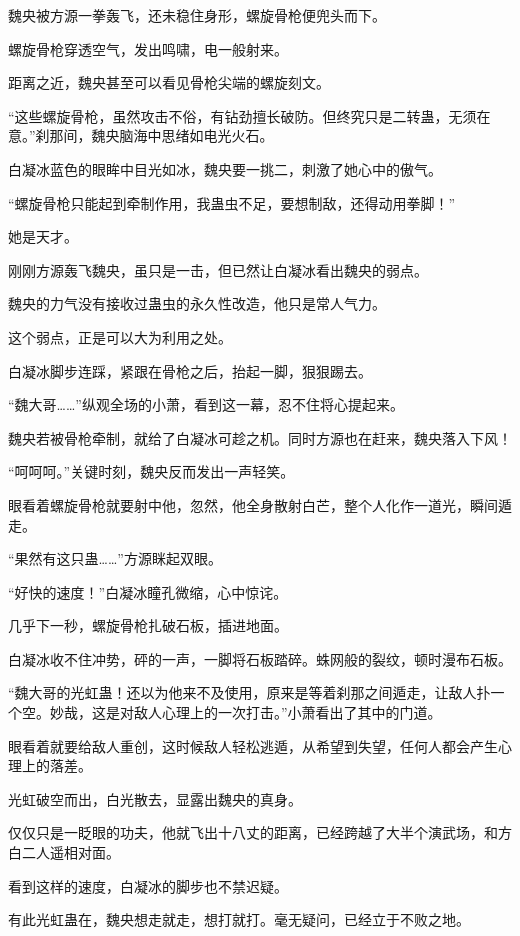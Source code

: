 
\begin{this_body}

魏央被方源一拳轰飞，还未稳住身形，螺旋骨枪便兜头而下。

螺旋骨枪穿透空气，发出鸣啸，电一般射来。

距离之近，魏央甚至可以看见骨枪尖端的螺旋刻文。

“这些螺旋骨枪，虽然攻击不俗，有钻劲擅长破防。但终究只是二转蛊，无须在意。”刹那间，魏央脑海中思绪如电光火石。

白凝冰蓝色的眼眸中目光如冰，魏央要一挑二，刺激了她心中的傲气。

“螺旋骨枪只能起到牵制作用，我蛊虫不足，要想制敌，还得动用拳脚！”

她是天才。

刚刚方源轰飞魏央，虽只是一击，但已然让白凝冰看出魏央的弱点。

魏央的力气没有接收过蛊虫的永久性改造，他只是常人气力。

这个弱点，正是可以大为利用之处。

白凝冰脚步连踩，紧跟在骨枪之后，抬起一脚，狠狠踢去。

“魏大哥……”纵观全场的小萧，看到这一幕，忍不住将心提起来。

魏央若被骨枪牵制，就给了白凝冰可趁之机。同时方源也在赶来，魏央落入下风！

“呵呵呵。”关键时刻，魏央反而发出一声轻笑。

眼看着螺旋骨枪就要射中他，忽然，他全身散射白芒，整个人化作一道光，瞬间遁走。

“果然有这只蛊……”方源眯起双眼。

“好快的速度！”白凝冰瞳孔微缩，心中惊诧。

几乎下一秒，螺旋骨枪扎破石板，插进地面。

白凝冰收不住冲势，砰的一声，一脚将石板踏碎。蛛网般的裂纹，顿时漫布石板。

“魏大哥的光虹蛊！还以为他来不及使用，原来是等着刹那之间遁走，让敌人扑一个空。妙哉，这是对敌人心理上的一次打击。”小萧看出了其中的门道。

眼看着就要给敌人重创，这时候敌人轻松逃遁，从希望到失望，任何人都会产生心理上的落差。

光虹破空而出，白光散去，显露出魏央的真身。

仅仅只是一眨眼的功夫，他就飞出十八丈的距离，已经跨越了大半个演武场，和方白二人遥相对面。

看到这样的速度，白凝冰的脚步也不禁迟疑。

有此光虹蛊在，魏央想走就走，想打就打。毫无疑问，已经立于不败之地。


\end{this_body}
